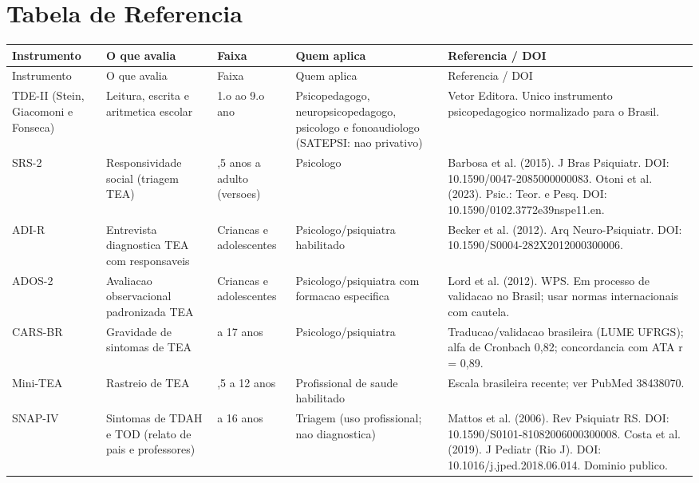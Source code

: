 \documentclass[a4paper,11pt]{book}
\begin{document}
\section*{Tabela de Referencia}
\setlength{\tabcolsep}{4pt}
\begin{longtable}{@{}>{\raggedright\arraybackslash}p{3.0cm}>{\raggedright\arraybackslash}p{3.6cm}>{\raggedright\arraybackslash}p{1.8cm}>{\raggedright\arraybackslash}p{2.7cm}>{\raggedright\arraybackslash}p{4.1cm}@{}}
\toprule
Instrumento & O que avalia & Faixa & Quem aplica & Referencia / DOI \\
\midrule
\endfirsthead
\toprule
Instrumento & O que avalia & Faixa & Quem aplica & Referencia / DOI \\
\midrule
\endhead
TDE-II (Stein, Giacomoni e Fonseca) & Leitura, escrita e aritmetica escolar & 1.o ao 9.o ano & Psicopedagogo, neuropsicopedagogo, psicologo e fonoaudiologo (SATEPSI: nao privativo) & Vetor Editora. Unico instrumento psicopedagogico normalizado para o Brasil. \\
SRS-2 & Responsividade social (triagem TEA) & 2,5 anos a adulto (versoes) & Psicologo & Barbosa et al. (2015). J Bras Psiquiatr. DOI: 10.1590/\hspace{0pt}0047-2085000000083. Otoni et al. (2023). Psic.: Teor. e Pesq. DOI: 10.1590/\hspace{0pt}0102.3772e39nspe11.en. \\
ADI-R & Entrevista diagnostica TEA com responsaveis & Criancas e adolescentes & Psicologo/psiquiatra habilitado & Becker et al. (2012). Arq Neuro-Psiquiatr. DOI: 10.1590/\hspace{0pt}S0004-282X2012000300006. \\
ADOS-2 & Avaliacao observacional padronizada TEA & Criancas e adolescentes & Psicologo/psiquiatra com formacao especifica & Lord et al. (2012). WPS. Em processo de validacao no Brasil; usar normas internacionais com cautela. \\
CARS-BR & Gravidade de sintomas de TEA & 3 a 17 anos & Psicologo/psiquiatra & Traducao/validacao brasileira (LUME UFRGS); alfa de Cronbach 0,82; concordancia com ATA r = 0,89. \\
Mini-TEA & Rastreio de TEA & 2,5 a 12 anos & Profissional de saude habilitado & Escala brasileira recente; ver PubMed 38438070. \\
SNAP-IV & Sintomas de TDAH e TOD (relato de pais e professores) & 4 a 16 anos & Triagem (uso profissional; nao diagnostica) & Mattos et al. (2006). Rev Psiquiatr RS. DOI: 10.1590/\hspace{0pt}S0101-81082006000300008. Costa et al. (2019). J Pediatr (Rio J). DOI: 10.1016/\hspace{0pt}j.jped.2018.06.014. Dominio publico. \\

\end{longtable}
\end{document}
